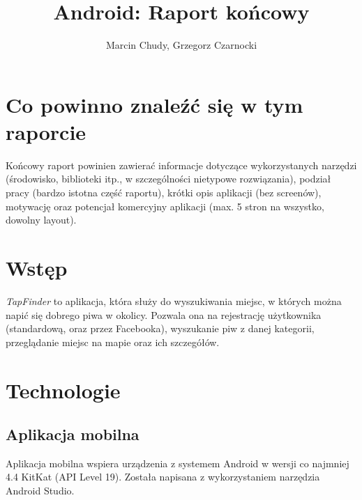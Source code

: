 \documentclass[a4paper]{article}
\title{Android: Raport końcowy}
\author{Marcin Chudy, Grzegorz Czarnocki}
\begin{document}
\maketitle

\section{Co powinno znaleźć się w tym raporcie}

Końcowy raport powinien zawierać informacje dotyczące wykorzystanych narzędzi (środowisko, biblioteki itp., w szczególności nietypowe rozwiązania), podział pracy (bardzo istotna część raportu), krótki opis aplikacji (bez screenów), motywację oraz potencjał komercyjny aplikacji (max. 5 stron na wszystko, dowolny layout).

\section{Wstęp}

\textit{TapFinder} to aplikacja, która służy do wyszukiwania miejsc, w których można napić się dobrego piwa w okolicy. Pozwala ona na rejestrację użytkownika (standardową, oraz przez Facebooka), wyszukanie piw z danej kategorii, przeglądanie miejsc na mapie oraz ich szczegółów.

\section{Technologie}

\subsection{Aplikacja mobilna}
Aplikacja mobilna wspiera urządzenia z systemem Android w wersji co najmniej 4.4 KitKat (API Level 19). Została napisana z wykorzystaniem narzędzia Android Studio.
\end{document}
